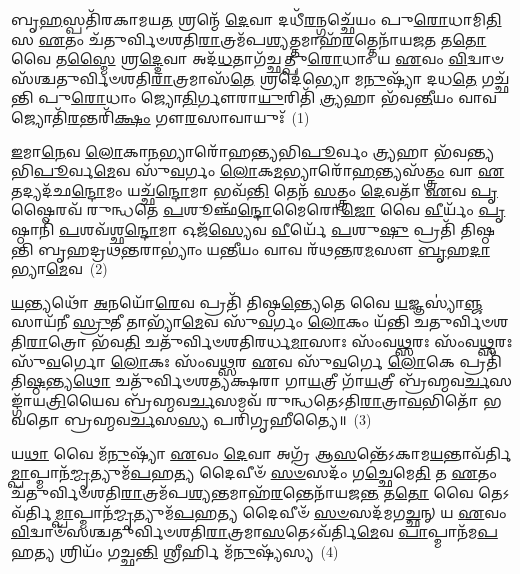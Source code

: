 \setcounter{anuvakam}{0}
𑌬𑍃\-\ul{𑌹}\-𑌸𑍍𑌪𑌤𑌿᳴𑌰𑌕𑌾𑌮𑌯\-\ul{𑌤} 𑌶𑍍𑌰𑌨𑍍𑌮𑍇᳴ \ul{𑌦𑍇}\-𑌵𑌾 𑌦𑌧𑍀᳴\-\ul{𑌰}\-𑌨𑍍𑌗𑌚𑍍𑌛𑍇᳴𑌯𑌂 𑌪𑍁\-\ul{𑌰𑍋}\-𑌧𑌾𑌮𑌿\-\ul{𑌤𑌿} 𑌸 \ul{𑌏}\-𑌤𑌂 𑌚᳴𑌤𑍁𑌰𑍍𑌵𑌿𑍞𑌶𑌤𑌿\-\ul{𑌰𑌾}\-𑌤𑍍𑌰𑌮᳴𑌪\-\ul{𑌶𑍍𑌯}\-𑌤𑍍𑌤𑌮𑌾𑌹᳴\-\ul{𑌰}\-𑌤𑍍𑌤𑍇𑌨𑌾᳴𑌯𑌜\-\ul{𑌤} 𑌤\-\ul{𑌤𑍋} 𑌵𑍈 𑌤\-\ul{𑌸𑍍𑌮𑍈} 𑌶𑍍𑌰\-\ul{𑌦𑍍𑌦𑍇}\-𑌵𑌾 𑌅𑌦᳴\-\ul{𑌧}\-𑌤𑌾𑌗᳴𑌚𑍍𑌛𑌤𑍍𑌪𑍁\-\ul{𑌰𑍋}\-𑌧𑌾𑌂 𑌯 \ul{𑌏}\-𑌵𑌂 \ul{𑌵𑌿}\-𑌦𑍍𑌵𑌾𑍞𑌸᳴𑌶𑍍𑌚𑌤𑍁𑌰𑍍𑌵𑌿𑍞𑌶𑌤𑌿\-\ul{𑌰𑌾}\-𑌤𑍍𑌰𑌮𑌾𑌸᳴\-\ul{𑌤𑍇} 𑌶𑍍𑌰𑌦𑍇॑𑌭𑍍𑌯𑍋 𑌮\-\ul{𑌨𑍁}\-𑌷𑍍𑌯𑌾᳴ 𑌦𑌧\-\ul{𑌤𑍇} 𑌗𑌚𑍍𑌛᳴𑌨𑍍𑌤𑌿 𑌪𑍁\-\ul{𑌰𑍋}\-𑌧𑌾𑌂 𑌜𑍍𑌯𑍋\-\ul{𑌤𑌿}\-𑌰𑍍𑌗𑍗𑌰𑌾\-\ul{𑌯𑍁}\-𑌰𑌿𑌤𑌿᳴ \ul{𑌤𑍍𑌰𑍍𑌯}\-𑌹𑌾 𑌭᳴𑌵\-\ul{𑌨𑍍𑌤𑍀}\-𑌯𑌂 𑌵𑌾𑌵 𑌜𑍍𑌯𑍋𑌤𑌿᳴\-\ul{𑌰}\-𑌨𑍍𑌤𑌰𑌿᳴\-\ul{𑌕𑍍𑌷𑌂} 𑌗𑍗\-\ul{𑌰}\-𑌸𑌾𑌵𑌾𑌯𑍁𑌃᳴~(1)

\-\ul{𑌇}\-𑌮𑌾\-\ul{𑌨𑍇}\-𑌵 \ul{𑌲𑍋}\-𑌕𑌾\-\ul{𑌨}\-𑌭𑍍𑌯𑌾𑌰𑍋᳴𑌹𑌨𑍍𑌤𑍍𑌯𑌭𑌿\-\ul{𑌪𑍂}\-𑌰𑍍𑌵𑌂 \ul{𑌤𑍍𑌰𑍍𑌯}\-𑌹𑌾 𑌭᳴𑌵𑌨𑍍𑌤𑍍𑌯𑌭𑌿\-\ul{𑌪𑍂}\-𑌰𑍍𑌵\-\ul{𑌮𑍇}\-𑌵 𑌸𑍁᳴\-\ul{𑌵}\-𑌰𑍍𑌗𑌂 \ul{𑌲𑍋}\-𑌕\-\ul{𑌮}\-𑌭𑍍𑌯𑌾𑌰𑍋᳴\-\ul{𑌹}\-𑌨𑍍𑌤𑍍𑌯𑌸᳴\-\ul{𑌤𑍍𑌤𑍍𑌰𑌂} 𑌵𑌾 \ul{𑌏}\-𑌤𑌦𑍍𑌯𑌦᳴𑌛\-\ul{𑌨𑍍𑌦𑍋}\-𑌮𑌂 𑌯𑌚𑍍𑌛᳴\-\ul{𑌨𑍍𑌦𑍋}\-𑌮𑌾 𑌭𑌵᳴\-\ul{𑌨𑍍𑌤𑌿} 𑌤𑍇𑌨᳴ \ul{𑌸}\-𑌤𑍍𑌤𑍍𑌰𑌂 \ul{𑌦𑍇}\-𑌵𑌤𑌾᳴ \ul{𑌏}\-𑌵 \ul{𑌪𑍃}\-𑌷𑍍𑌠𑍈𑌰𑌵᳴ 𑌰𑍁𑌨𑍍𑌧𑌤𑍇 \ul{𑌪}\-𑌶𑍂𑌞𑍍𑌛᳴\-\ul{𑌨𑍍𑌦𑍋}\-𑌮𑍈𑌰𑍋\-\ul{𑌜𑍋} 𑌵𑍈 \ul{𑌵𑍀}\-𑌰𑍍𑌯𑌂᳴ \ul{𑌪𑍃}\-𑌷𑍍𑌠𑌾𑌨𑌿᳴ \ul{𑌪}\-𑌶𑌵᳴𑌶𑍍𑌛\-\ul{𑌨𑍍𑌦𑍋}\-𑌮𑌾 𑌓𑌜᳴\-\ul{𑌸𑍍𑌯𑍇}\-𑌵 \ul{𑌵𑍀}\-𑌰𑍍𑌯𑍇᳴ \ul{𑌪}\-𑌶𑍁\-\ul{𑌷𑍁} 𑌪𑍍𑌰𑌤𑌿᳴ 𑌤𑌿𑌷𑍍𑌠𑌨𑍍𑌤𑌿 𑌬𑍃𑌹𑌦𑍍𑌰𑌥\-\ul{𑌨𑍍𑌤}\-𑌰𑌾\-𑌭𑍍𑌯𑌾𑌂॑ 𑌯\-\ul{𑌨𑍍𑌤𑍀}\-𑌯𑌂 𑌵𑌾𑌵 𑌰᳴𑌥\-\ul{𑌨𑍍𑌤}\-𑌰\-\ul{𑌮}\-𑌸𑍗 \ul{𑌬𑍃}\-𑌹\-\ul{𑌦𑌾}\-𑌭𑍍𑌯𑌾\-\ul{𑌮𑍇}\-𑌵~(2)

\-\ul{𑌯}\-𑌨𑍍𑌤𑍍𑌯𑌥𑍋᳴ \ul{𑌅}\-𑌨𑌯𑍋᳴\-\ul{𑌰𑍇}\-𑌵 𑌪𑍍𑌰𑌤𑌿᳴ 𑌤𑌿𑌷𑍍𑌠\-\ul{𑌨𑍍𑌤𑍍𑌯𑍇}\-𑌤𑍇 𑌵𑍈 \ul{𑌯}\-𑌜𑍍𑌞𑌸𑍍𑌯𑌾॑\-\ul{𑌞𑍍𑌜}\-𑌸𑌾𑌯᳴𑌨𑍀 \ul{𑌸𑍍𑌰𑍁}\-𑌤𑍀 𑌤𑌾𑌭𑍍𑌯𑌾᳴\-\ul{𑌮𑍇}\-𑌵 𑌸𑍁᳴\-\ul{𑌵}\-𑌰𑍍𑌗𑌂 \ul{𑌲𑍋}\-𑌕𑌂 𑌯᳴𑌨𑍍𑌤𑌿 𑌚𑌤𑍁𑌰𑍍𑌵𑌿𑍞𑌶𑌤𑌿\-\ul{𑌰𑌾}\-𑌤𑍍𑌰𑍋 𑌭᳴𑌵\-\ul{𑌤𑌿} 𑌚𑌤𑍁᳴𑌰𑍍𑌵𑌿𑍞𑌶𑌤𑌿𑌰𑌰𑍍𑌧\-\ul{𑌮𑌾}\-𑌸𑌾𑌃 𑌸𑌂᳴𑌵\-\ul{𑌥𑍍𑌸}\-𑌰𑌃 𑌸𑌂᳴𑌵\-\ul{𑌥𑍍𑌸}\-𑌰𑌃 𑌸𑍁᳴\-\ul{𑌵}\-𑌰𑍍𑌗𑍋 \ul{𑌲𑍋}\-𑌕𑌃 𑌸𑌂᳴𑌵\-\ul{𑌥𑍍𑌸}\-𑌰 \ul{𑌏}\-𑌵 𑌸𑍁᳴\-\ul{𑌵}\-𑌰𑍍𑌗𑍇 \ul{𑌲𑍋}\-𑌕𑍇 𑌪𑍍𑌰𑌤𑌿᳴ 𑌤𑌿\-\ul{𑌷𑍍𑌠}\-𑌨𑍍𑌤𑍍𑌯\-\ul{𑌥𑍋} 𑌚𑌤𑍁᳴𑌰𑍍𑌵𑌿𑍞𑌶𑌤𑍍𑌯𑌕𑍍𑌷𑌰𑌾 𑌗𑌾\-\ul{𑌯}\-𑌤𑍍𑌰𑍀 𑌗𑌾᳴\-\ul{𑌯}\-𑌤𑍍𑌰𑍀 𑌬𑍍𑌰᳴𑌹𑍍𑌮𑌵\-\ul{𑌰𑍍𑌚}\-𑌸𑌙𑍍𑌗𑌾᳴𑌯\-\ul{𑌤𑍍𑌰𑌿}\-𑌯𑍈𑌵 𑌬𑍍𑌰᳴𑌹𑍍𑌮𑌵\-\ul{𑌰𑍍𑌚}\-𑌸𑌮𑌵᳴ 𑌰𑍁𑌨𑍍𑌧𑌤𑍇\-𑌽𑌤𑌿\-\ul{𑌰𑌾}\-𑌤𑍍𑌰𑌾\-\ul{𑌵}\-𑌭𑌿𑌤𑍋᳴ 𑌭𑌵𑌤𑍋 𑌬𑍍𑌰𑌹𑍍𑌮𑌵\-\ul{𑌰𑍍𑌚}\-𑌸\-\ul{𑌸𑍍𑌯} 𑌪𑌰𑌿᳴𑌗𑍃𑌹𑍀𑌤𑍍𑌯𑍈॥~(3)

{\anuvakamend[{\-\ul{𑌅}\-𑌸𑌾𑌵𑌾𑌯𑍁᳴\-\ul{𑌰𑌾}\-𑌭𑍍𑌯𑌾\-\ul{𑌮𑍇}\-𑌵 𑌪𑌞𑍍𑌚᳴𑌚𑌤𑍍𑌵𑌾𑌰𑌿𑍞𑌶𑌚𑍍𑌚}]}%

𑌯\-\ul{𑌥𑌾} 𑌵𑍈 𑌮᳴\-\ul{𑌨𑍁}\-𑌷𑍍𑌯𑌾᳴ \ul{𑌏}\-𑌵𑌂 \ul{𑌦𑍇}\-𑌵𑌾 𑌅𑌗𑍍𑌰᳴ 𑌆\-\ul{𑌸}\-𑌨𑍍𑌤𑍇᳴\-𑌽𑌕𑌾𑌮\-\ul{𑌯}\-𑌨𑍍𑌤𑌾𑌵᳴𑌰𑍍𑌤𑌿\-\ul{𑌮𑍍𑌪𑌾}\-𑌪𑍍𑌮𑌾𑌨᳴\-\ul{𑌮𑍍𑌮𑍃}\-𑌤𑍍𑌯𑍁𑌮᳴\-\ul{𑌪}\-𑌹\-\ul{𑌤𑍍𑌯} 𑌦𑍈𑌵𑍀𑍞᳴ \ul{𑌸}\-\-\ul{𑍞}\-𑌸𑌦𑌂᳴ 𑌗\-\ul{𑌚𑍍𑌛𑍇}\-𑌮𑍇\-\ul{𑌤𑌿} 𑌤 \ul{𑌏}\-𑌤𑌂 𑌚᳴𑌤𑍁𑌰𑍍𑌵𑌿𑍞𑌶𑌤𑌿\-\ul{𑌰𑌾}\-𑌤𑍍𑌰𑌮᳴𑌪\-\ul{𑌶𑍍𑌯}\-𑌨𑍍𑌤𑌮𑌾𑌹᳴\-\ul{𑌰}\-𑌨𑍍𑌤𑍇𑌨𑌾᳴𑌯𑌜\-\ul{𑌨𑍍𑌤} 𑌤\-\ul{𑌤𑍋} 𑌵𑍈 𑌤𑍇\-𑌽𑌵᳴𑌰𑍍𑌤𑌿\-\ul{𑌮𑍍𑌪𑌾}\-𑌪𑍍𑌮𑌾𑌨᳴\-\ul{𑌮𑍍𑌮𑍃}\-𑌤𑍍𑌯𑍁𑌮᳴\-\ul{𑌪}\-𑌹\-\ul{𑌤𑍍𑌯} 𑌦𑍈𑌵𑍀𑍞᳴ \ul{𑌸}\-\-\ul{𑍞}\-𑌸𑌦᳴𑌮𑌗\-\ul{𑌚𑍍𑌛}\-𑌨𑍍 𑌯 \ul{𑌏}\-𑌵𑌂 \ul{𑌵𑌿}\-𑌦𑍍𑌵𑌾𑍞᳴𑌸𑌶𑍍𑌚𑌤𑍁𑌰𑍍𑌵𑌿𑍞𑌶𑌤𑌿\-\ul{𑌰𑌾}\-𑌤𑍍𑌰𑌮𑌾\-\ul{𑌸}\-𑌤𑍇\-𑌽𑌵᳴𑌰𑍍𑌤𑌿\-\ul{𑌮𑍇}\-𑌵 \ul{𑌪𑌾}\-𑌪𑍍𑌮𑌾𑌨᳴𑌮\-\ul{𑌪}\-𑌹\-\ul{𑌤𑍍𑌯} 𑌶𑍍𑌰𑌿𑌯𑌂᳴ 𑌗𑌚𑍍𑌛\-\ul{𑌨𑍍𑌤𑌿} 𑌶𑍍𑌰𑍀𑌰𑍍\mbox{}𑌹𑌿 𑌮᳴\-\ul{𑌨𑍁}\-𑌷𑍍𑌯᳴𑌸𑍍𑌯~(4)

